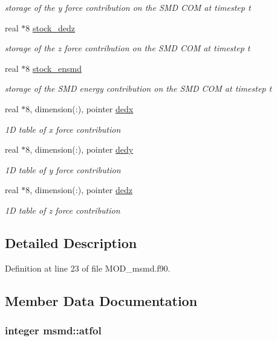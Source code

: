 \begin{DoxyCompactItemize}
\begin{DoxyCompactList}\small\item\em storage of the y force contribution on the S\-M\-D C\-O\-M at timestep t \end{DoxyCompactList}\item 
real $\ast$8 \hyperlink{classmsmd_ab701a51c1aa7c929d6086f4d2550e55f}{stock\-\_\-dedz}
\begin{DoxyCompactList}\small\item\em storage of the z force contribution on the S\-M\-D C\-O\-M at timestep t \end{DoxyCompactList}\item 
real $\ast$8 \hyperlink{classmsmd_ad2f343580b4cf844e2c9a84fea789100}{stock\-\_\-ensmd}
\begin{DoxyCompactList}\small\item\em storage of the S\-M\-D energy contribution on the S\-M\-D C\-O\-M at timestep t \end{DoxyCompactList}\item 
real $\ast$8, dimension(\-:), pointer \hyperlink{classmsmd_a9343c86fbd3756f350b7f0f9b9b224a4}{dedx}
\begin{DoxyCompactList}\small\item\em 1\-D table of x force contribution \end{DoxyCompactList}\item 
real $\ast$8, dimension(\-:), pointer \hyperlink{classmsmd_a7926ca2df6f47e20454581e3b619f8d3}{dedy}
\begin{DoxyCompactList}\small\item\em 1\-D table of y force contribution \end{DoxyCompactList}\item 
real $\ast$8, dimension(\-:), pointer \hyperlink{classmsmd_a20266d06c8fd7a1b7ded88962bc59339}{dedz}
\begin{DoxyCompactList}\small\item\em 1\-D table of z force contribution \end{DoxyCompactList}\end{DoxyCompactItemize}


\subsection{Detailed Description}


Definition at line 23 of file M\-O\-D\-\_\-msmd.\-f90.



\subsection{Member Data Documentation}
\hypertarget{classmsmd_a227412ce8c92691533ff296b74dfde92}{
\subsubsection[{atfol}]{\setlength{\rightskip}{0pt plus 5cm}integer msmd\-::atfol}}\label{classmsmd_a227412ce8c92691533ff296b74dfde92}


